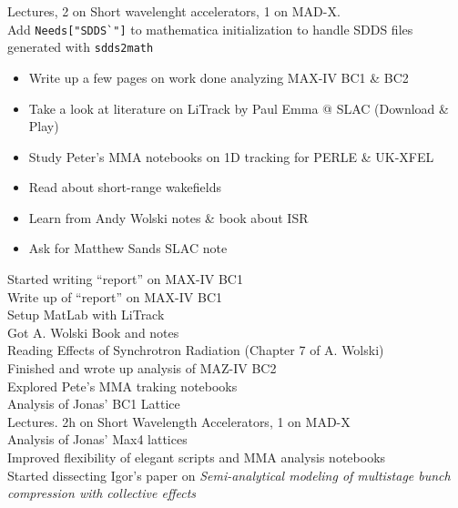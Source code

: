 
Lectures, 2 on Short wavelenght accelerators, 1 on MAD-X.\\
Add \verb|Needs["SDDS`"]| to mathematica initialization to handle SDDS files generated with \verb|sdds2math|\\



\begin{itemize}
    \item Write up a few pages on work done analyzing MAX-IV BC1 \& BC2
    \item Take a look at literature on LiTrack by Paul Emma @ SLAC (Download \& Play)
    \item Study Peter's MMA notebooks on 1D tracking for PERLE \& UK-XFEL
    \item Read about short-range wakefields
    \item Learn from Andy Wolski notes \& book about ISR
    \item Ask for Matthew Sands SLAC note
\end{itemize}
Started writing ``report'' on MAX-IV BC1\\

Write up of ``report'' on MAX-IV BC1\\
Setup MatLab with LiTrack\\
Got A. Wolski Book and notes\\


Reading Effects of Synchrotron Radiation (Chapter 7 of A. Wolski)\\


Finished and wrote up analysis of MAZ-IV BC2\\
Explored Pete's MMA traking notebooks\\
Analysis of Jonas' BC1 Lattice\\

Lectures. 2h on Short Wavelength Accelerators, 1 on MAD-X\\
Analysis of Jonas' Max4 lattices\\


Improved flexibility of elegant scripts and MMA analysis notebooks\\
Started dissecting Igor's paper on \emph{Semi-analytical modeling of multistage bunch compression with collective effects}\\

